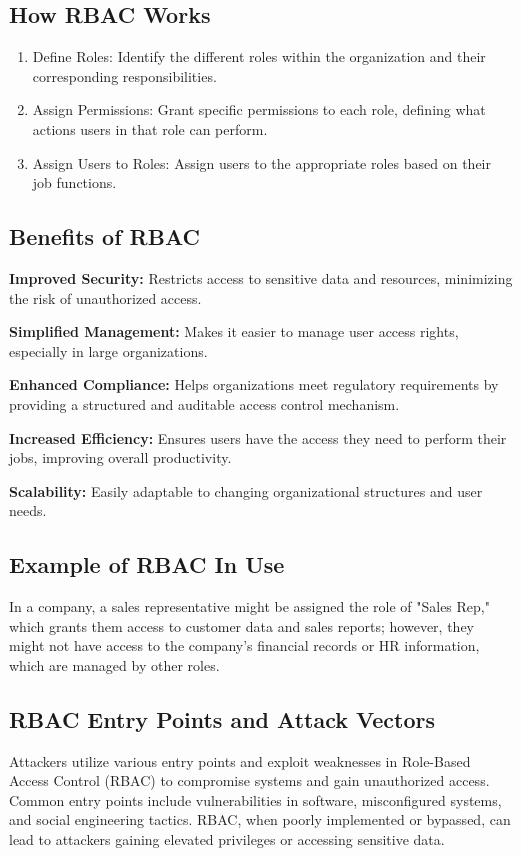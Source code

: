 \subsection{How RBAC Works}
\begin{enumerate}
        \item Define Roles: Identify the different roles within the organization and their corresponding responsibilities. 
        \item Assign Permissions: Grant specific permissions to each role, defining what actions users in that role can perform. 
        \item Assign Users to Roles: Assign users to the appropriate roles based on their job functions. 
\end{enumerate}

\subsection{Benefits of RBAC}
\textbf{Improved Security:}
Restricts access to sensitive data and resources, minimizing the risk of unauthorized access. 

\textbf{Simplified Management:}
Makes it easier to manage user access rights, especially in large organizations. 

\textbf{Enhanced Compliance:}
Helps organizations meet regulatory requirements by providing a structured and auditable access control mechanism. 

\textbf{Increased Efficiency:}
Ensures users have the access they need to perform their jobs, improving overall productivity. 

\textbf{Scalability:}
Easily adaptable to changing organizational structures and user needs. 

\subsection{Example of RBAC In Use}
In a company, a sales representative might be assigned the role of "Sales Rep," which grants them access to customer data and sales reports; however, they might not have access to the company's financial records or HR information, which are managed by other roles.

\subsection{RBAC Entry Points and Attack Vectors}
Attackers utilize various entry points and exploit weaknesses in Role-Based Access Control (RBAC) to compromise systems and gain unauthorized access. Common entry points include vulnerabilities in software, misconfigured systems, and social engineering tactics. RBAC, when poorly implemented or bypassed, can lead to attackers gaining elevated privileges or accessing sensitive data. 

